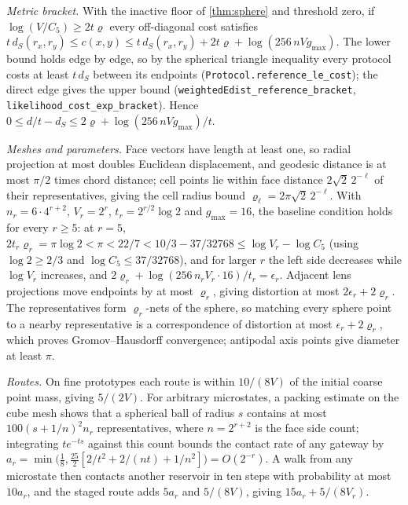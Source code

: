 \documentclass[11pt]{article}
\newcommand{\lean}[1]{\nolinkurl{#1}}
\begin{document}
\emph{Metric bracket.}
With the inactive floor of \cref{thm:sphere} and threshold zero, if $\log(V/C_5)\ge2t\varrho$ every off-diagonal cost satisfies $t\,d_S(r_x,r_y)\le c(x,y)\le t\,d_S(r_x,r_y)+2t\varrho+\log(256\,nVg_{\max})$.
The lower bound holds edge by edge, so by the spherical triangle inequality every protocol costs at least $t\,d_S$ between its endpoints (\lean{Protocol.reference_le_cost}); the direct edge gives the upper bound (\lean{weightedEdist_reference_bracket}, \lean{likelihood_cost_exp_bracket}).
Hence $0\le d/t-d_S\le2\varrho+\log(256\,nVg_{\max})/t$.

\emph{Meshes and parameters.}
Face vectors have length at least one, so radial projection at most doubles Euclidean displacement, and geodesic distance is at most $\pi/2$ times chord distance; cell points lie within face distance $2\sqrt2\,2^{-\ell}$ of their representatives, giving the cell radius bound $\varrho_\ell=2\pi\sqrt2\,2^{-\ell}$.
With $n_r=6\cdot4^{r+2}$, $V_r=2^r$, $t_r=2^{r/2}\log2$ and $g_{\max}=16$, the baseline condition holds for every $r\ge5$: at $r=5$, $2t_r\varrho_r=\pi\log2<\pi<22/7<10/3-37/32768\le\log V_r-\log C_5$ (using $\log2\ge2/3$ and $\log C_5\le37/32768$), and for larger $r$ the left side decreases while $\log V_r$ increases, and $2\varrho_r+\log(256\,n_rV_r\cdot16)/t_r=\epsilon_r$.
Adjacent lens projections move endpoints by at most $\varrho_r$, giving distortion at most $2\epsilon_r+2\varrho_r$.
The representatives form $\varrho_r$-nets of the sphere, so matching every sphere point to a nearby representative is a correspondence of distortion at most $\epsilon_r+2\varrho_r$, which proves Gromov--Hausdorff convergence; antipodal axis points give diameter at least $\pi$.

\emph{Routes.}
On fine prototypes each route is within $10/(8V)$ of the initial coarse point mass, giving $5/(2V)$.
For arbitrary microstates, a packing estimate on the cube mesh shows that a spherical ball of radius $s$ contains at most $100(s+1/n)^2n_r$ representatives, where $n=2^{r+2}$ is the face side count; integrating $te^{-ts}$ against this count bounds the contact rate of any gateway by $a_r=\min\bigl(\tfrac18,\tfrac{25}2[2/t^2+2/(nt)+1/n^2]\bigr)=O(2^{-r})$.
A walk from any microstate then contacts another reservoir in ten steps with probability at most $10a_r$, and the staged route adds $5a_r$ and $5/(8V)$, giving $15a_r+5/(8V_r)$.
\end{document}
